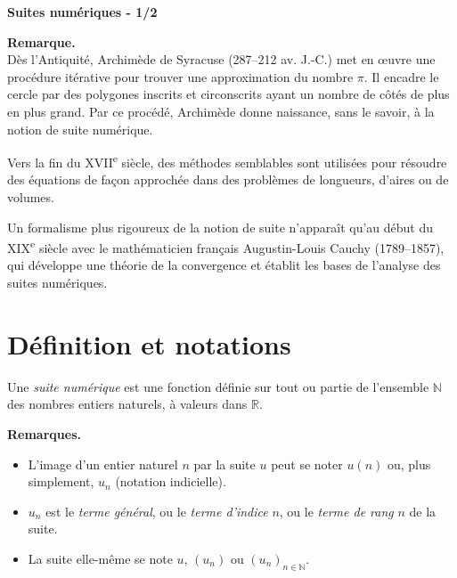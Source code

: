 \documentclass[11pt]{article}
\newcommand{\RR}{\mathbb{R}}
\newcommand{\NN}{\mathbb{N}}
\newenvironment{remarque}{\par\smallskip\noindent\textbf{Remarque. \\}\ignorespaces}{\par\smallskip}
\newenvironment{remarques}{\par\smallskip\noindent\textbf{Remarques. \\}\ignorespaces}{\par\smallskip}
\begin{document}
\begin{definition}
\begin{center}
    {\Huge\bfseries Suites numériques - 1/2}
\end{center}
\end{definition}

\begin{remarque}
Dès l'Antiquité, Archimède de Syracuse (287--212 av. J.-C.) met en œuvre une procédure itérative pour trouver une approximation du nombre $\pi$. Il encadre le cercle par des polygones inscrits et circonscrits ayant un nombre de côtés de plus en plus grand. Par ce procédé, Archimède donne naissance, sans le savoir, à la notion de suite numérique.

Vers la fin du XVII\textsuperscript{e} siècle, des méthodes semblables sont utilisées pour résoudre des équations de façon approchée dans des problèmes de longueurs, d'aires ou de volumes.

Un formalisme plus rigoureux de la notion de suite n'apparaît qu'au début du XIX\textsuperscript{e} siècle avec le mathématicien français Augustin-Louis Cauchy (1789--1857), qui développe une théorie de la convergence et établit les bases de l'analyse des suites numériques.
\end{remarque}

\section{Définition et notations}

\begin{definition}
Une \emph{suite numérique} est une fonction définie sur tout ou partie de l'ensemble $\NN$ des nombres entiers naturels, à valeurs dans $\RR$.
\end{definition}

\begin{remarques}
\begin{itemize}
    \item L'image d'un entier naturel $n$ par la suite $u$ peut se noter $u(n)$ ou, plus simplement, $u_n$ (notation indicielle).
    \item $u_n$ est le \emph{terme général}, ou le \emph{terme d'indice} $n$, ou le \emph{terme de rang} $n$ de la suite.
    \item La suite elle-même se note $u$, $(u_n)$ ou $(u_n)_{n\in\NN}$.
\end{itemize}
\end{remarques}
\end{document}
